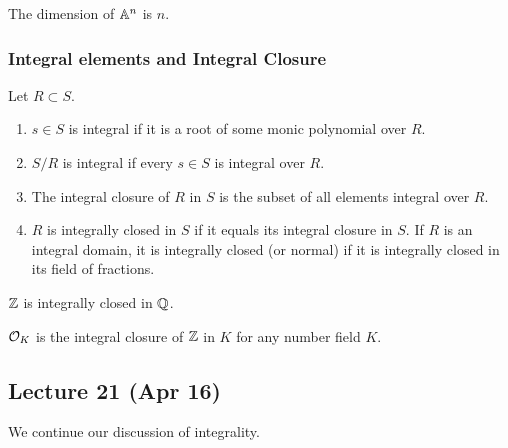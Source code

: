 \message{ !name(notes.tex)}\documentclass[10pt, twoside]{article}
\begin{document}
        \begin{exm}
            The dimension of $\mathbb{A}^n$ is $n$.
        \end{exm}

        \subsubsection{Integral elements and Integral Closure}
        
       
        \begin{defn}
             Let $R \subset S$.
            \begin{enumerate}
                \item $s \in S$ is integral if it is a root of some monic polynomial over $R$.
                \item $S/R$ is integral if every $s \in S$ is integral over $R$.
                \item The integral closure of $R$ in $S$ is the subset of all elements integral over $R$.
                \item $R$ is integrally closed in $S$ if it equals its integral closure in $S$. If $R$ is an integral domain, it is integrally closed (or normal) if it is integrally closed in its field of fractions.
            \end{enumerate}
        \end{defn}

        \begin{exm}
            $\mathbb{Z}$ is integrally closed in $\mathbb{Q}$.
        \end{exm}

        \begin{exm}
            $\mathcal{O}_K$ is the integral closure of $\mathbb{Z}$ in $K$ for any number field $K$.
        \end{exm}
        
        \subsection{Lecture 21 (Apr 16)}
        We continue our discussion of integrality.
\end{document}
